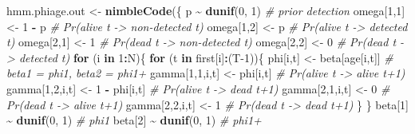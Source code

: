 \documentclass[
  12pt,
]{krantz}
\newenvironment{Shaded}{\begin{snugshade}}{\end{snugshade}}
\newcommand{\CommentTok}[1]{\textcolor[rgb]{0.56,0.35,0.01}{\textit{#1}}}
\newcommand{\ControlFlowTok}[1]{\textcolor[rgb]{0.13,0.29,0.53}{\textbf{#1}}}
\newcommand{\DecValTok}[1]{\textcolor[rgb]{0.00,0.00,0.81}{#1}}
\newcommand{\FunctionTok}[1]{\textcolor[rgb]{0.13,0.29,0.53}{\textbf{#1}}}
\newcommand{\NormalTok}[1]{#1}
\newcommand{\OtherTok}[1]{\textcolor[rgb]{0.56,0.35,0.01}{#1}}
\newcommand{\SpecialCharTok}[1]{\textcolor[rgb]{0.81,0.36,0.00}{\textbf{#1}}}
\begin{document}
\begin{Shaded}
\begin{Highlighting}[]
\NormalTok{hmm.phiage.out }\OtherTok{\textless{}{-}} \FunctionTok{nimbleCode}\NormalTok{(\{}
\NormalTok{  p }\SpecialCharTok{\textasciitilde{}} \FunctionTok{dunif}\NormalTok{(}\DecValTok{0}\NormalTok{, }\DecValTok{1}\NormalTok{)                   }\CommentTok{\# prior detection}
\NormalTok{  omega[}\DecValTok{1}\NormalTok{,}\DecValTok{1}\NormalTok{] }\OtherTok{\textless{}{-}} \DecValTok{1} \SpecialCharTok{{-}}\NormalTok{ p               }\CommentTok{\# Pr(alive t {-}\textgreater{} non{-}detected t)}
\NormalTok{  omega[}\DecValTok{1}\NormalTok{,}\DecValTok{2}\NormalTok{] }\OtherTok{\textless{}{-}}\NormalTok{ p                   }\CommentTok{\# Pr(alive t {-}\textgreater{} detected t)}
\NormalTok{  omega[}\DecValTok{2}\NormalTok{,}\DecValTok{1}\NormalTok{] }\OtherTok{\textless{}{-}} \DecValTok{1}                   \CommentTok{\# Pr(dead t {-}\textgreater{} non{-}detected t)}
\NormalTok{  omega[}\DecValTok{2}\NormalTok{,}\DecValTok{2}\NormalTok{] }\OtherTok{\textless{}{-}} \DecValTok{0}                   \CommentTok{\# Pr(dead t {-}\textgreater{} detected t)}
  \ControlFlowTok{for}\NormalTok{ (i }\ControlFlowTok{in} \DecValTok{1}\SpecialCharTok{:}\NormalTok{N)\{}
    \ControlFlowTok{for}\NormalTok{ (t }\ControlFlowTok{in}\NormalTok{ first[i]}\SpecialCharTok{:}\NormalTok{(T}\DecValTok{{-}1}\NormalTok{))\{}
\NormalTok{    phi[i,t] }\OtherTok{\textless{}{-}}\NormalTok{ beta[age[i,t]]      }\CommentTok{\# beta1 = phi1, beta2 = phi1+}
\NormalTok{    gamma[}\DecValTok{1}\NormalTok{,}\DecValTok{1}\NormalTok{,i,t] }\OtherTok{\textless{}{-}}\NormalTok{ phi[i,t]      }\CommentTok{\# Pr(alive t {-}\textgreater{} alive t+1)}
\NormalTok{    gamma[}\DecValTok{1}\NormalTok{,}\DecValTok{2}\NormalTok{,i,t] }\OtherTok{\textless{}{-}} \DecValTok{1} \SpecialCharTok{{-}}\NormalTok{ phi[i,t]  }\CommentTok{\# Pr(alive t {-}\textgreater{} dead t+1)}
\NormalTok{    gamma[}\DecValTok{2}\NormalTok{,}\DecValTok{1}\NormalTok{,i,t] }\OtherTok{\textless{}{-}} \DecValTok{0}             \CommentTok{\# Pr(dead t {-}\textgreater{} alive t+1)}
\NormalTok{    gamma[}\DecValTok{2}\NormalTok{,}\DecValTok{2}\NormalTok{,i,t] }\OtherTok{\textless{}{-}} \DecValTok{1}             \CommentTok{\# Pr(dead t {-}\textgreater{} dead t+1)}
\NormalTok{    \}}
\NormalTok{  \}}
\NormalTok{  beta[}\DecValTok{1}\NormalTok{] }\SpecialCharTok{\textasciitilde{}} \FunctionTok{dunif}\NormalTok{(}\DecValTok{0}\NormalTok{, }\DecValTok{1}\NormalTok{) }\CommentTok{\# phi1}
\NormalTok{  beta[}\DecValTok{2}\NormalTok{] }\SpecialCharTok{\textasciitilde{}} \FunctionTok{dunif}\NormalTok{(}\DecValTok{0}\NormalTok{, }\DecValTok{1}\NormalTok{) }\CommentTok{\# phi1+}

\end{Highlighting}
\end{Shaded}
\end{document}
